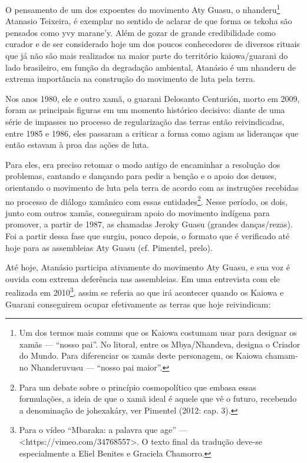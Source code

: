 \documentclass{article}
\begin{document}
O pensamento de um dos expoentes do movimento Aty Guasu, o
nhanderu\footnote{ Um dos termos mais comuns que os Kaiowa costumam
usar para designar os xam\~as --- {\textquotedblleft}nosso
pai{\textquotedblright}. No litoral, entre os Mbya/Nhandeva, designa o
Criador do Mundo. Para diferenciar os xam\~as deste personagem, os
Kaiowa chamam-no Nhanderuvusu --- {\textquotedblleft}nosso pai
maior{\textquotedblright}.} Atanasio Teixeira, \'e exemplar no sentido
de aclarar de que forma os tekoha s\~ao pensados como yvy
marane{\textquoteright}y. Al\'em de gozar de grande credibilidade como
curador e de ser considerado hoje um dos poucos conhecedores de
diversos rituais que j\'a n\~ao s\~ao mais realizados na maior parte do
territ\'orio kaiowa/guarani do lado brasileiro, em fun\c{c}\~ao da
degrada\c{c}\~ao ambiental, Atan\'asio \'e um nhanderu de extrema
import\^ancia na constru\c{c}\~ao do movimento de luta pela terra. 

Nos anos 1980, ele e outro xam\~a, o guarani Delosanto Centuri\'on,
morto em 2009, foram as principais figuras em um momento hist\'orico
decisivo: diante de uma s\'erie de impasses no processo de
regulariza\c{c}\~ao das terras ent\~ao reivindicadas, entre 1985 e
1986, eles passaram a criticar a forma como agiam as lideran\c{c}as que
ent\~ao estavam \`a proa das a\c{c}\~oes de luta.

Para eles, era preciso retomar o modo antigo de encaminhar a
resolu\c{c}\~ao dos problemas, cantando e dan\c{c}ando para pedir a
ben\c{c}\~ao e o apoio dos deuses, orientando o movimento de luta pela
terra de acordo com as instru\c{c}\~oes recebidas no processo de
di\'alogo xam\^anico com essas entidades\footnote{ Para um debate sobre
o princ\'ipio cosmopol\'itico que embasa essas formula\c{c}\~oes, a
ideia de que o xam\~a ideal \'e aquele que v\^e o futuro, recebendo a
denomina\c{c}\~ao de johexak\'ary, ver Pimentel (2012: cap. 3).}. Nesse
per\'iodo, os dois, junto com outros xam\~as, conseguiram apoio do
movimento ind\'igena para promover, a partir de 1987, as chamadas
Jeroky Guasu (grandes dan\c{c}as/rezas). Foi a partir dessa fase que
surgiu, pouco depois, o formato que \'e verificado at\'e hoje para as
assembleias Aty Guasu (cf. Pimentel, prelo).

At\'e hoje, Atan\'asio participa ativamente do movimento Aty Guasu, e
sua voz \'e ouvida com extrema defer\^encia nas assembleias. Em uma
entrevista com ele realizada em 2010\footnote{ Para o v\'ideo
{\textquotedblleft}Mbaraka: a palavra que age{\textquotedblright} ---
{\textless}https://vimeo.com/34768557{\textgreater}. O texto final da
tradu\c{c}\~ao deve-se especialmente a Eliel Benites e Graciela
Chamorro.}, assim se referia ao que ir\'a acontecer quando os Kaiowa e
Guarani conseguirem ocupar efetivamente as terras que hoje reivindicam:
\end{document}
